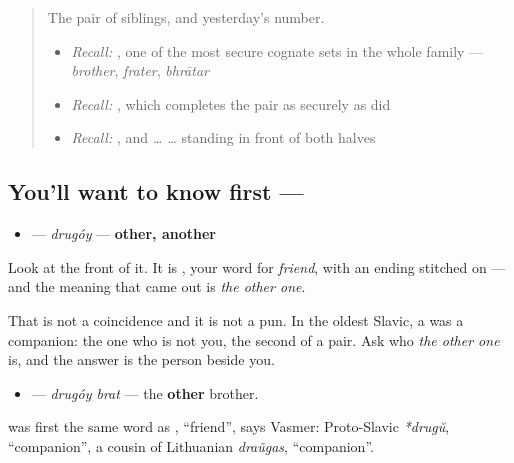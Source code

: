 \label{lesson:RU-C17-drugoy}



\begin{quote}
The pair of siblings, and yesterday's number.

\begin{itemize}
\raggedright
  \item \emph{Recall:} \emph{}, one of the most secure cognate sets in the whole family — \emph{brother}, \emph{frater}, \emph{bhrātar}
  \item \emph{Recall:} \emph{}, which completes the pair as securely as \emph{} did
  \item \emph{Recall:} \emph{}, and \emph{ …  …} standing in front of both halves
\end{itemize}
\end{quote}

\subsection*{You'll want to know first — }
\begin{itemize}
\raggedright
  \item \textbf{} — \emph{drugóy} — \textbf{other, another}
\end{itemize}

Look at the front of it. It is \textbf{}, your word for \emph{friend}, with an ending stitched on — and the meaning that came out is \emph{the other one}.

That is not a coincidence and it is not a pun. In the oldest Slavic, a \textbf{} was a companion: the one who is not you, the second of a pair. Ask who \emph{the other one} is, and the answer is the person beside you.

\begin{itemize}
\raggedright
  \item \textbf{ } — \emph{drugóy brat} — the \textbf{other} brother.
\end{itemize}

\begin{cousinweb}
\textbf{} was first the same word as \emph{}, \textquotedblleft{}friend\textquotedblright{}, says Vasmer: Proto-Slavic \emph{*drugŭ}, \textquotedblleft{}companion\textquotedblright{}, a cousin of Lithuanian \emph{draũgas}, \textquotedblleft{}companion\textquotedblright{}.
\end{cousinweb}

